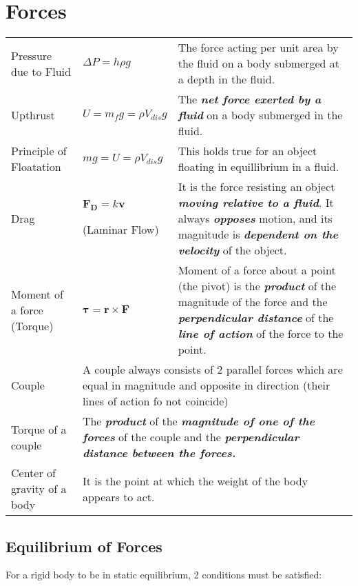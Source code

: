 \documentclass[a4paper]{article}
\begin{document}
	\section{Forces}
		\begin{center}
			\renewcommand{\arraystretch}{1.2}
			\begin{tabular}{@{} l l p{7cm} @{}}
				\toprule
				Pressure due to Fluid & $\Delta P = h\rho g$ & The force acting per unit area by the fluid on a body submerged at a depth in the fluid. \\
				Upthrust & $U=m_{f}g=\rho V_{dis}g$ & The \textbf{\textit{net force exerted by a fluid}} on a body submerged in the fluid. \\
				Principle of Floatation & $mg=U=\rho V_{dis} g$ & This holds true for an object floating in equillibrium in a fluid.  \\
				Drag & \multicolumn{1}{p{2.5cm}}{$\textbf{F}_{\textbf{D}}=k\textbf{v}$ \par (Laminar Flow)} & It is the force resisting an object \textbf{\textit{moving relative to a fluid}}. It always \textit{\textbf{opposes}} motion, and its magnitude is \textbf{\textit{dependent on the velocity}} of the object.\\
				\midrule
				Moment of a force (Torque) & $\boldsymbol{\tau}=\textbf{r} \times \textbf{F}$ & Moment of a force about a point (the pivot) is the \textit{\textbf{product}} of the magnitude of the force and the \textbf{\textit{perpendicular distance}} of the \textbf{\textit{line of action}} of the force to the point. \\
				Couple & \multicolumn{2}{p{10.3cm}}{A couple always consists of 2 parallel forces which are equal in magnitude and opposite in direction (their lines of action fo not coincide)} \\
				Torque of a couple & \multicolumn{2}{p{10.3cm}}{The \textbf{\textit{product}} of the \textbf{\textit{magnitude of one of the forces}} of the couple and the \textbf{\textit{perpendicular distance between the forces.}}} \\
				Center of gravity of a body & \multicolumn{2}{l}{It is the point at which the weight of the body appears to act.} \\
				\bottomrule
			\end{tabular}
		\end{center}
		\subsection{Equilibrium of Forces}
			For a rigid body to be in static equilibrium, 2 conditions must be satisfied:
			
\end{document}
